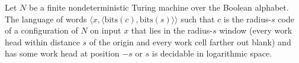\begin{theorem}
\label{Complexity.Codec.edgeLang_mem}
\leanok
{}
Let $N$ be a finite nondeterministic Turing machine over the Boolean alphabet. The language of
words $\langle x,\langle\mathrm{bits}(c),\mathrm{bits}(s)\rangle\rangle$ such that $c$ is the
radius-$s$ code of a configuration of $N$ on input $x$ that lies in the radius-$s$ window
(every work head within distance $s$ of the origin and every work cell farther out blank) and
has some work head at position $-s$ or $s$ is decidable in logarithmic space.
\end{theorem}

